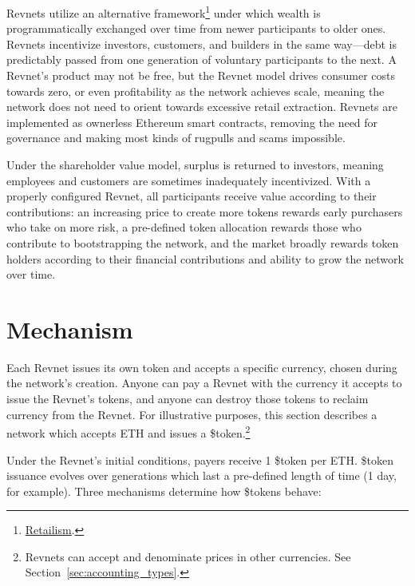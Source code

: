 \documentclass{article}
\begin{document}
Revnets utilize an alternative framework\footnote{\href{https://jango.eth.limo/9E01E72C-6028-48B7-AD04-F25393307132}{Retailism}.} under which wealth is programmatically exchanged over time from newer participants to older ones. Revnets incentivize investors, customers, and builders in the same way---debt is predictably passed from one generation of voluntary participants to the next. A Revnet's product may not be free, but the Revnet model drives consumer costs towards zero, or even profitability as the network achieves scale, meaning the network does not need to orient towards excessive retail extraction. Revnets are implemented as ownerless Ethereum smart contracts, removing the need for governance and making most kinds of rugpulls and scams impossible.

Under the shareholder value model, surplus is returned to investors, meaning employees and customers are sometimes inadequately incentivized. With a properly configured Revnet, all participants receive value according to their contributions: an increasing price to create more tokens rewards early purchasers who take on more risk, a pre-defined token allocation rewards those who contribute to bootstrapping the network, and the market broadly rewards token holders according to their financial contributions and ability to grow the network over time.

\section{Mechanism}

Each Revnet issues its own token and accepts a specific currency, chosen during the network's creation. Anyone can pay a Revnet with the currency it accepts to issue the Revnet's tokens, and anyone can destroy those tokens to reclaim currency from the Revnet. For illustrative purposes, this section describes a network which accepts ETH and issues a \$token.\footnote{Revnets can accept and denominate prices in other currencies. See Section~\ref{sec:accounting_types}.}

Under the Revnet's initial conditions, payers receive 1 \$token per ETH. \$token issuance evolves over generations which last a pre-defined length of time (1 day, for example). Three mechanisms determine how \$tokens behave:
\end{document}
